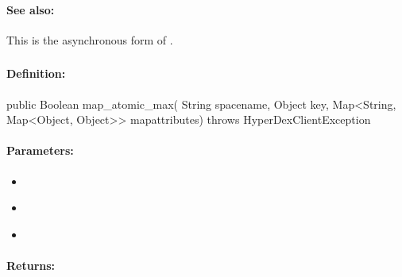 \paragraph{See also:}  This is the asynchronous form of .

\pagebreak
\subsubsection{}
\label{api:java:map_atomic_max}


\paragraph{Definition:}
\begin{javacode}
public Boolean map_atomic_max(
        String spacename,
        Object key,
        Map<String, Map<Object, Object>> mapattributes) throws HyperDexClientException
\end{javacode}

\paragraph{Parameters:}
\begin{itemize}[noitemsep]
\item {}\\

\item {}\\

\item {}\\

\end{itemize}

\paragraph{Returns:}


\pagebreak
\subsubsection{}
\label{api:java:async_map_atomic_max}


